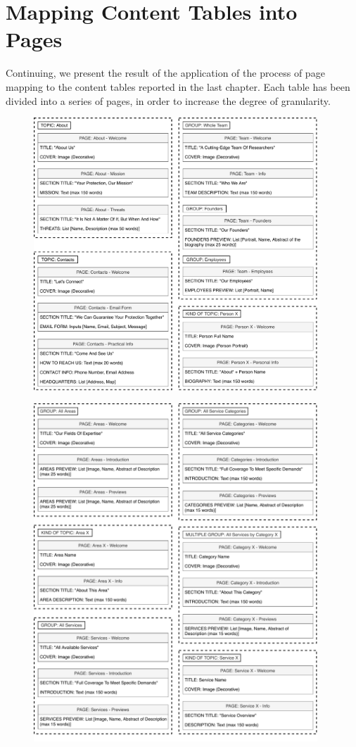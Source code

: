 \documentclass[12pt]{report}
\begin{document}
\chapter{Mapping Content Tables into Pages}
Continuing, we present the result of the application of the process of page mapping 
to the content tables reported in the last chapter. Each table has
been divided into a series of pages, in order to increase the degree of granularity.
\begin{figure}[h]
	\centering
	\includegraphics[width=0.95\textwidth]{page_mapping_pt1.pdf}
\end{figure}
\begin{figure}[h]
	\centering
	\includegraphics[width=0.95\textwidth]{page_mapping_pt2.pdf}
\end{figure}
\end{document}
